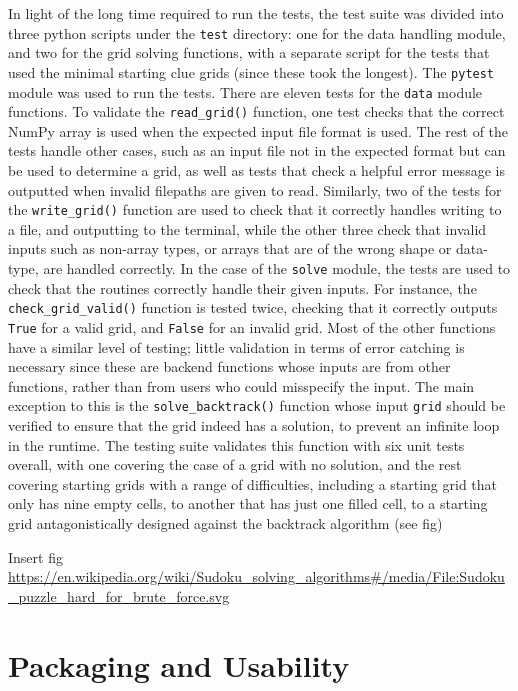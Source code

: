 \documentclass[12pt]{article}
\begin{document}
In light of the long time required to run the tests, the test suite was divided into three python scripts under the \texttt{test} directory: one for the data handling module, and two for the grid solving functions, with a separate script for the tests that used the minimal starting clue grids (since these took the longest).
The \texttt{pytest} module was used to run the tests.
There are eleven tests for the \texttt{data} module functions.
To validate the \texttt{read\_grid()} function, one test checks that the correct NumPy array is used when the expected input file format is used.
The rest of the tests handle other cases, such as an input file not in the expected format but can be used to determine a grid, as well as tests that check a helpful error message is outputted when invalid filepaths are given to read.
Similarly, two of the tests for the \texttt{write\_grid()} function are used to check that it correctly handles writing to a file, and outputting to the terminal, while the other three check that invalid inputs such as non-array types, or arrays that are of the wrong shape or data-type, are handled correctly.
In the case of the \texttt{solve} module, the tests are used to check that the routines correctly handle their given inputs.
For instance, the \texttt{check\_grid\_valid()} function is tested twice, checking that it correctly outputs \texttt{True} for a valid grid, and \texttt{False} for an invalid grid.
Most of the other functions have a similar level of testing; little validation in terms of error catching is necessary since these are backend functions whose inputs are from other functions, rather than from users who could misspecify the input.
The main exception to this is the \texttt{solve\_backtrack()} function whose input \texttt{grid} should be verified to ensure that the grid indeed has a solution, to prevent an infinite loop in the runtime.
The testing suite validates this function with six unit tests overall, with one covering the case of a grid with no solution, and the rest covering starting grids with a range of difficulties, including a starting grid that only has nine empty cells, to another that has just one filled cell, to a starting grid antagonistically designed against the backtrack algorithm (see fig)

Insert fig \url{https://en.wikipedia.org/wiki/Sudoku_solving_algorithms#/media/File:Sudoku_puzzle_hard_for_brute_force.svg}

\section*{Packaging and Usability}
\end{document}
